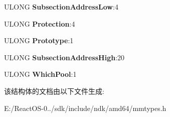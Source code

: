\begin{DoxyCompactItemize}
\mbox{\label{struct___m_m_p_t_e___s_u_b_s_e_c_t_i_o_n_a98779e128163b85771cdb9a3fcd6b0f3}} 
U\+L\+O\+NG {\bfseries Subsection\+Address\+Low}\+:4
\item 
\mbox{\label{struct___m_m_p_t_e___s_u_b_s_e_c_t_i_o_n_a6521df7b10d9809c5ed390e253e6a4f3}} 
U\+L\+O\+NG {\bfseries Protection}\+:4
\item 
\mbox{\label{struct___m_m_p_t_e___s_u_b_s_e_c_t_i_o_n_a74aecf4f8918ebaaf6c88a44c28b5dc0}} 
U\+L\+O\+NG {\bfseries Prototype}\+:1
\item 
\mbox{\label{struct___m_m_p_t_e___s_u_b_s_e_c_t_i_o_n_a944ca5f1b1e38b392c1d8cf15a820504}} 
U\+L\+O\+NG {\bfseries Subsection\+Address\+High}\+:20
\item 
\mbox{\label{struct___m_m_p_t_e___s_u_b_s_e_c_t_i_o_n_a0621cc9b2a7b4ea331c0b3f39771b211}} 
U\+L\+O\+NG {\bfseries Which\+Pool}\+:1
\end{DoxyCompactItemize}


该结构体的文档由以下文件生成\+:\begin{DoxyCompactItemize}
\item 
E\+:/\+React\+O\+S-\/0../sdk/include/ndk/amd64/mmtypes.\+h\end{DoxyCompactItemize}
